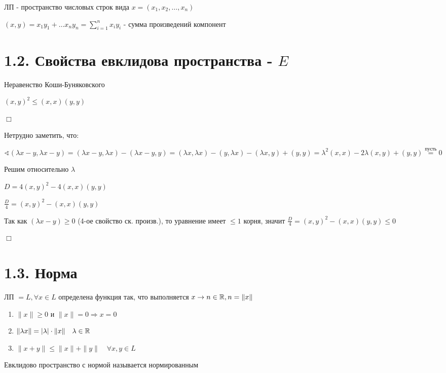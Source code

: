 \documentclass[12pt]{article}
\begin{document}
     ЛП - пространство числовых строк вида $\displaystyle x = (x_1, x_2, \dots, x_n)$

    $\displaystyle (x, y) = x_1 y_1 + \dots x_n y_n = \sum_{i=1}^n x_i y_i$ - сумма произведений компонент

    \section{1.2. Свойства евклидова пространства - $E$}

    \Th Неравенство Коши-Буняковского

    $\displaystyle (x, y)^2 \leq (x, x)(y, y)$

    $\Box$

    Нетрудно заметить, что:

    $\displaystyle \sphericalangle (\lambda x - y, \lambda x - y) = (\lambda x - y, \lambda x) - (\lambda x - y, y) =
    (\lambda x, \lambda x) - (y, \lambda x) - (\lambda x, y) + (y, y) = \lambda^2 (x, x) - 2\lambda (x, y) + (y, y) \stackrel{\text{пусть}}{=} 0$

    Решим относительно $\lambda$

    $\displaystyle D = 4(x, y)^2 - 4(x, x)(y, y)$

    $\displaystyle \frac{D}{4} = (x, y)^2 - (x, x)(y, y)$

    Так как $(\lambda x - y) \geq 0$ (4-ое свойство ск. произв.), то уравнение имеет $\leq 1$ корня, значит
    $\displaystyle \frac{D}{4} = (x, y)^2 - (x, x)(y, y) \leq 0$

    $\Box$

    \section{1.3. Норма}

    ЛП $= L, \forall x \in L$ определена функция так, что выполняется $x \to n \in \mathbb{R}, n = \|x\|$

    \begin{enumerate}
        \item $\|x\| \geq 0$ и $\|x\| = 0 \Longrightarrow x = 0$
        \item $\|\lambda x\| = |\lambda| \cdot \|x\| \quad \lambda \in \mathbb{R}$
        \item $\|x + y\| \leq \|x\| + \|y\| \quad \forall x, y \in L$
    \end{enumerate}

    Евклидово пространство с нормой называется нормированным
\end{document}
